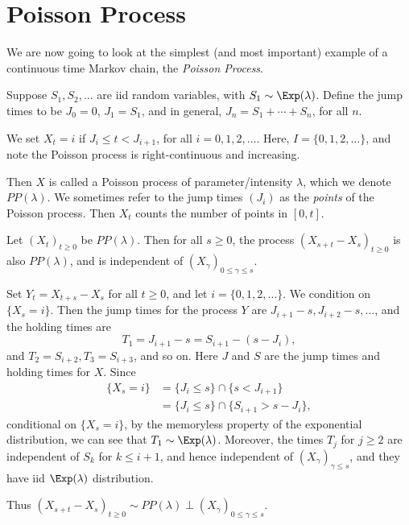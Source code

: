\documentclass[12pt]{article}
\begin{document}
\newpage

\section{Poisson Process}

We are now going to look at the simplest (and most important) example of a continuous time Markov chain, the \emph{Poisson Process}.

Suppose $S_1, S_2, \ldots$ are iid random variables, with $S_1 \sim \Exp(\lambda)$. Define the jump times to be $J_0 = 0$, $J_1 = S_1$, and in general, $J_n = S_1 + \cdots + S_n$, for all $n$.

We set $X_t = i$ if $J_i \leq t < J_{i+1}$, for all $i = 0, 1, 2, \ldots$. Here, $I= \{0, 1, 2, \ldots\}$, and note the Poisson process is right-continuous and increasing.

Then $X$ is called a Poisson process of parameter/intensity $\lambda$, which we denote $PP(\lambda)$. We sometimes refer to the jump times $(J_i)$ as the \emph{points} of the Poisson process. Then $X_t$ counts the number of points in $[0, t]$.

\begin{theorem}
	Let $(X_t)_{t \geq 0}$ be $PP(\lambda)$. Then for all $s \geq 0$, the process $(X_{s+t}-X_s)_{t \geq 0}$ is also $PP(\lambda)$, and is independent of $(X_{\gamma})_{0 \leq \gamma \leq s}$.
\end{theorem}

\begin{proofbox}
	Set $Y_t = X_{t+s} - X_s$ for all $t \geq 0$, and let $i = \{0, 1, 2, \ldots\}$. We condition on $\{X_s = i\}$. Then the jump times for the process $Y$ are $J_{i+1}-s, J_{i+2}-s, \ldots$, and the holding times are
	\[
	T_1 = J_{i+1} - s = S_{i+1} - (s - J_i)
	,\]
	and $T_2 = S_{i+2}, T_3 = S_{i+3}$, and so on. Here $J$ and $S$ are the jump times and holding times for $X$. Since
	\begin{align*}
		\{X_{s} = i\} &= \{J_i \leq s\} \cap \{s < J_{i+1}\} \\
			      &= \{J_i \leq s\} \cap \{S_{i+1} > s - J_i\},
	\end{align*}
	conditional on $\{X_s = i\}$, by the memoryless property of the exponential distribution, we can see that $T_1 \sim \Exp(\lambda)$. Moreover, the times $T_j$ for $j \geq 2$ are independent of $S_k$ for $k \leq i+1$, and hence independent of $(X_{\gamma})_{\gamma \leq s}$, and they have iid $\Exp(\lambda)$ distribution.

	Thus $(X_{s+t}-X_s)_{t\geq 0} \sim PP(\lambda) \perp (X_{\gamma})_{0 \leq \gamma \leq s}$.
\end{proofbox}
\end{document}
